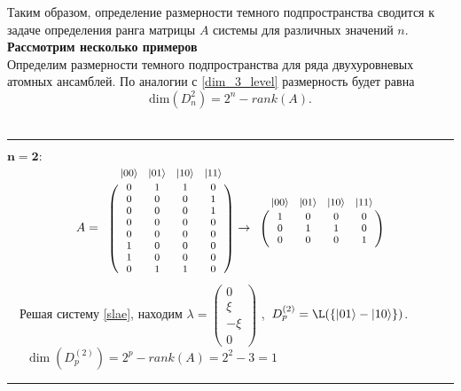 \noindent Таким образом, определение размерности темного подпространства сводится к задаче определения ранга матрицы $A$ системы для различных значений $n$.
\\[24pt]
\noindent \textbf{Рассмотрим несколько примеров}\\[12pt]
Определим размерности темного подпространства для ряда двухуровневых атомных ансамблей. По аналогии с \eqref{dim_3_level} размерность будет равна
\[
\mathrm{dim}(D_{n}^{2}) = 2^{n} - rank(A).
\]
\
\\
\medskip\hrule\medskip
\noindent$\mathbf{n = 2:}$
\begin{equation}\label{eq:matrix2}
	{\footnotesize
		A =
		\bordermatrix{
			& |00\ra & |01\ra & |10\ra & |11\ra \cr
			& 0 & 1 & 1 & 0 \cr
			& 0 & 0 & 0 & 1 \cr
			& 0 & 0 & 0 & 1 \cr
			& 0 & 0 & 0 & 0 \cr
			& 0 & 0 & 0 & 0 \cr
			& 1 & 0 & 0 & 0 \cr
			& 1 & 0 & 0 & 0 \cr
			& 0 & 1 & 1 & 0 \cr
		}\rightarrow
		\bordermatrix{
			& |00\ra & |01\ra & |10\ra & |11\ra \cr
			& 1 & 0 & 0 & 0 \cr
			& 0 & 1 & 1 & 0 \cr
			& 0 & 0 & 0 & 1 \cr
		}
	}
\end{equation}
\quad\quad~~Решая систему \eqref{slae}, находим
{\footnotesize
	$\lambda =
	\begin{pmatrix}
		0\\
		\xi\\
		-\xi\\
		0
	\end{pmatrix}
	$
},\
\quad$D^{(2)}_p = \L(\{|01\ra - |10\ra\})$.\\[12pt]

\noindent\quad\quad~~~$\dim(D^{(2)}_p) = 2^{p} - rank(A) = 2^{2} - 3 = 1$\\

\medskip\hrule\medskip

